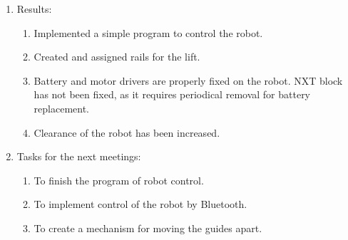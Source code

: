 \begin{enumerate}
\begin{enumerate}
    \end{enumerate}
    
	\item Results:  
	\begin{enumerate}
	  \item Implemented a simple program to control the robot.
	  
      \item  Created and assigned rails for the lift.
      
      \item  Battery and motor drivers are properly fixed on the robot. NXT block has not been fixed, as it requires periodical removal for battery replacement.
      
      \item Clearance of the robot has been increased.
      
    \end{enumerate}
    
	\item Tasks for the next meetings:
	\begin{enumerate}
	  \item To finish the program of robot control.
	  
	  \item To implement control of the robot by Bluetooth.
	  
	  \item To create a mechanism for moving the guides apart.
	  
    \end{enumerate}     
\end{enumerate}
\fillpage
